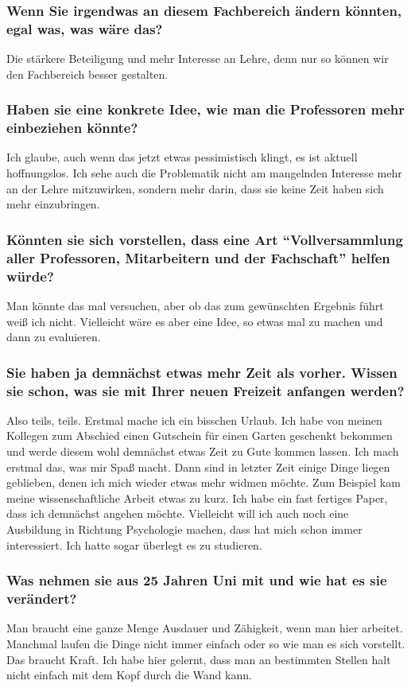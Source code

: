 {\subsubsection*{Wenn Sie irgendwas an diesem Fachbereich ändern könnten, egal was, was wäre das?}
Die stärkere Beteiligung und mehr Interesse an Lehre, denn nur so können wir den Fachbereich besser gestalten.
\subsubsection*{Haben sie eine konkrete Idee, wie man die Professoren mehr einbeziehen könnte?}
Ich glaube, auch wenn das jetzt etwas pessimistisch klingt, es ist aktuell hoffnungslos. Ich sehe auch die Problematik nicht am mangelnden Interesse mehr an der Lehre mitzuwirken, sondern mehr darin, dass sie keine Zeit haben sich mehr einzubringen.
\subsubsection*{Könnten sie sich vorstellen, dass eine Art "`Vollversammlung aller Professoren, Mitarbeitern und der Fachschaft"' helfen würde? }
Man könnte das mal versuchen, aber ob das zum gewünschten Ergebnis führt weiß ich nicht. Vielleicht wäre es aber eine Idee, so etwas mal zu machen und dann zu evaluieren.
\subsubsection*{Sie haben ja demnächst etwas mehr Zeit als vorher. Wissen sie schon, was sie mit Ihrer neuen Freizeit anfangen werden?}
Also teils, teils. Erstmal mache ich ein bisschen Urlaub. Ich habe von meinen Kollegen zum Abschied einen Gutschein für einen Garten geschenkt bekommen und werde diesem wohl demnächst etwas Zeit zu Gute kommen lassen. Ich mach erstmal das, was mir Spaß macht. Dann sind in letzter Zeit einige Dinge liegen geblieben, denen ich mich wieder etwas mehr widmen möchte. Zum Beispiel kam meine wissenschaftliche Arbeit etwas zu kurz. Ich habe ein fast fertiges Paper, dass ich demnächst angehen möchte. Vielleicht will ich auch noch eine Ausbildung in Richtung Psychologie machen, dass hat mich schon immer interessiert. Ich hatte sogar überlegt es zu studieren.
\subsubsection*{Was nehmen sie aus 25 Jahren Uni mit und wie hat es sie verändert?}
Man braucht eine ganze Menge Ausdauer und Zähigkeit, wenn man hier arbeitet. Manchmal laufen die Dinge nicht immer einfach oder so wie man es sich vorstellt. Das braucht Kraft. Ich habe hier gelernt, dass man an bestimmten Stellen halt nicht einfach mit dem Kopf durch die Wand kann.
}
